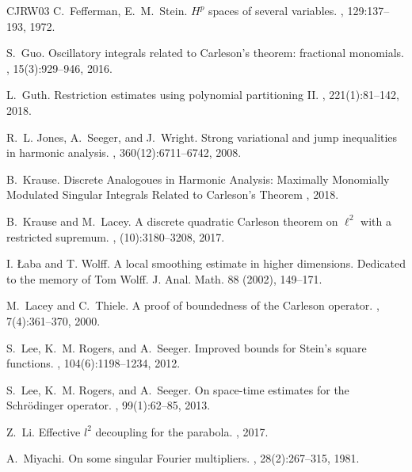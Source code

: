 \documentclass[12pt,leqno]{amsart}
\theoremstyle{plain}
\numberwithin{equation}{section}
\begin{document}
\begin{thebibliography}{CJRW03}
	C.~Fefferman, E.~M.~Stein.
	\newblock $H^p$ spaces of several variables.
	, 129:137--193, 1972.


	S.~Guo.
	\newblock Oscillatory integrals related to {C}arleson's theorem:
              fractional monomials.
	, 15(3):929--946, 2016.
	
	L.~Guth.
	\newblock Restriction estimates using polynomial partitioning II.
	, 221(1):81--142, 2018.
	
	R.~L. Jones, A.~Seeger, and J.~Wright.
	\newblock Strong variational and jump inequalities in harmonic analysis.
	, 360(12):6711--6742, 2008.
	
	
	B.~Krause.
	\newblock  Discrete Analogoues in Harmonic Analysis: Maximally Monomially Modulated Singular Integrals Related to Carleson's Theorem
	, 2018.
	
	B.~Krause and M.~Lacey.
	\newblock A discrete quadratic {C}arleson theorem on $\ell^2$ with a restricted
	supremum.
	, (10):3180--3208, 2017.
	
	I. {\L}aba and T. Wolff.
	\newblock A local smoothing estimate in higher dimensions. Dedicated to the memory of Tom Wolff.
	\newblock J. Anal. Math. 88 (2002), 149--171. 	
	
	M.~Lacey and C.~Thiele.
	\newblock A proof of boundedness of the {C}arleson operator.
	, 7(4):361--370, 2000.

	S.~Lee, K.~M. Rogers, and A.~Seeger.
	\newblock Improved bounds for {S}tein's square functions.
	, 104(6):1198--1234, 2012.
	
	S.~Lee, K.~M. Rogers, and A.~Seeger.
	\newblock On space-time estimates for the Schr\"{o}dinger operator. 
	, 99(1):62--85, 2013.	
	
	Z.~Li.
	\newblock Effective $l^2$ decoupling for the parabola.
	, 2017.
	
	A.~Miyachi.
	\newblock On some singular Fourier multipliers.
	, 28(2):267--315, 1981. 
	

\end{thebibliography}
\end{document}
